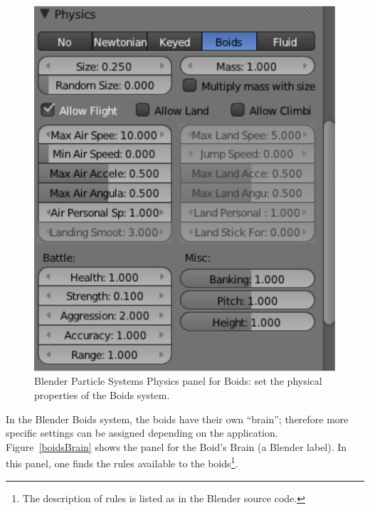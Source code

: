\begin{figure}[htbp]
\begin{center}
\includegraphics[scale = 0.65]{figures/boidsPhysics.pdf} 
\caption{Blender Particle Systems Physics panel for Boids: set the physical properties of the Boids system.}
\label{boidsPhysics}
\end{center}
\end{figure}

In the Blender Boids system, the boids have their own ``brain''; therefore more specific settings can be assigned depending on the application. Figure~\ref{boidsBrain} shows the panel for the Boid's Brain (a Blender label). In this panel, one finds the rules available to the boids\footnote{The description of rules is listed as in the Blender source code.}.

